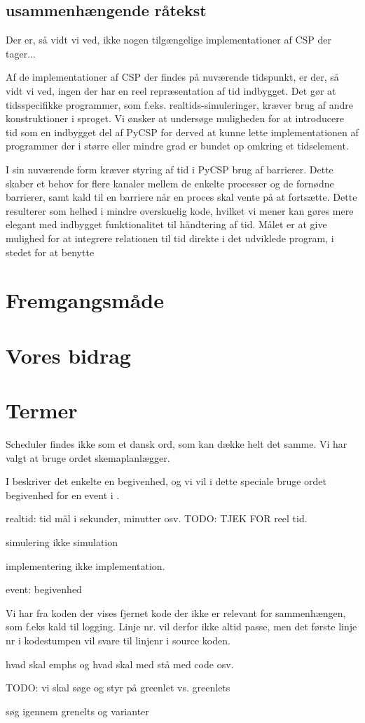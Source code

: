 \subsection{usammenhængende råtekst}
Der er, så vidt vi ved, ikke nogen tilgængelige implementationer af CSP der 
tager... 

Af de implementationer af CSP der findes på nuværende tidspunkt, er der, så 
vidt vi ved, ingen der har en reel repræsentation af tid indbygget. Det gør at 
tidsspecifikke programmer, som f.eks. realtids-simuleringer, kræver brug af 
andre konstruktioner i sproget.
Vi ønsker at undersøge muligheden for at introducere tid som en indbygget del 
af PyCSP for derved at kunne lette implementationen af programmer der i større 
eller mindre grad er bundet op omkring et tidselement. 


I sin nuværende form kræver styring af tid i PyCSP brug af 
barrierer. Dette skaber et 
behov for flere kanaler mellem de enkelte processer og de fornødne barrierer, 
samt kald til en barriere når en proces skal vente på at fortsætte.  Dette 
resulterer som helhed i mindre overskuelig kode, hvilket vi mener kan gøres 
mere elegant med indbygget funktionalitet til håndtering af tid. Målet er at 
give mulighed for at integrere relationen til tid direkte i det udviklede 
program, i stedet for at benytte 

\section{Fremgangsmåde}
\section{Vores bidrag}
\section{Termer}

\begin{list}{}{}
\tightlist
\item Scheduler findes ikke som et dansk ord, som kan  dække helt det samme. Vi har valgt at bruge ordet skemaplanlægger.
\item I \des beskriver det enkelte  en begivenhed, og vi vil i dette speciale bruge ordet begivenhed for en event i \des. 
\item realtid: tid mål i sekunder, minutter osv. TODO: TJEK FOR reel tid.
\item simulering ikke simulation
\item implementering ikke implementation.
\item event: begivenhed
\item Vi har fra koden der vises fjernet kode der ikke er relevant for sammenhængen, som f.eks kald til logging. Linje nr. vil derfor ikke altid passe, men det første linje nr i kodestumpen vil svare til linjenr i source koden.
\item hvad skal emphs og hvad skal med stå med code osv.
\item TODO: vi skal søge og styr på  greenlet vs. greenlets
\item søg igennem grenelts og varianter
\end{list}



